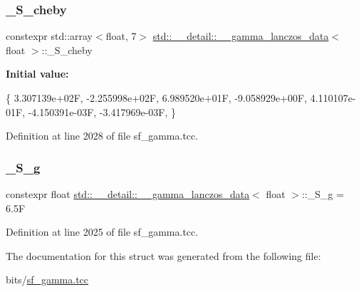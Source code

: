 \subsubsection{\texorpdfstring{\+\_\+\+S\+\_\+cheby}{\_S\_cheby}}
{\footnotesize\ttfamily constexpr std\+::array$<$float, 7$>$ \hyperlink{structstd_1_1____detail_1_1____gamma__lanczos__data}{std\+::\+\_\+\+\_\+detail\+::\+\_\+\+\_\+gamma\+\_\+lanczos\+\_\+data}$<$ float $>$\+::\+\_\+\+S\+\_\+cheby\hspace{0.3cm}{\ttfamily [static]}}

{\bfseries Initial value\+:}
\begin{DoxyCode}
\{
     3.307139e+02F,
    -2.255998e+02F,
     6.989520e+01F,
    -9.058929e+00F,
     4.110107e-01F,
    -4.150391e-03F,
    -3.417969e-03F,
      \}
\end{DoxyCode}


Definition at line 2028 of file sf\+\_\+gamma.\+tcc.

\mbox{\label{structstd_1_1____detail_1_1____gamma__lanczos__data_3_01float_01_4_aadc6da66fb542d6b88ddf3a0aef6249c}} 
\subsubsection{\texorpdfstring{\+\_\+\+S\+\_\+g}{\_S\_g}}
{\footnotesize\ttfamily constexpr float \hyperlink{structstd_1_1____detail_1_1____gamma__lanczos__data}{std\+::\+\_\+\+\_\+detail\+::\+\_\+\+\_\+gamma\+\_\+lanczos\+\_\+data}$<$ float $>$\+::\+\_\+\+S\+\_\+g = 6.\+5F\hspace{0.3cm}{\ttfamily [static]}}



Definition at line 2025 of file sf\+\_\+gamma.\+tcc.



The documentation for this struct was generated from the following file\+:\begin{DoxyCompactItemize}
\item 
bits/\hyperlink{sf__gamma_8tcc}{sf\+\_\+gamma.\+tcc}\end{DoxyCompactItemize}
